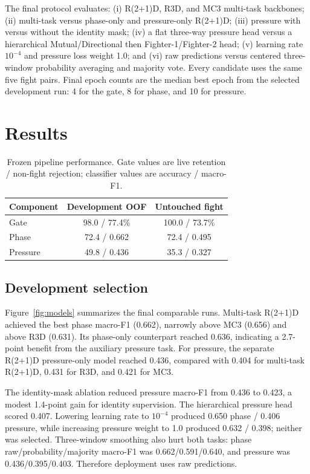 \documentclass[10pt,twocolumn]{article}
\newcommand{\macroF}{macro-F1}
\newcommand{\Rtwo}{R(2+1)D}
\begin{document}
The final protocol evaluates: (i) \Rtwo, R3D, and MC3 multi-task backbones; (ii) multi-task versus phase-only and pressure-only \Rtwo; (iii) pressure with versus without the identity mask; (iv) a flat three-way pressure head versus a hierarchical Mutual/Directional then Fighter-1/Fighter-2 head; (v) learning rate $10^{-4}$ and pressure loss weight 1.0; and (vi) raw predictions versus centered three-window probability averaging and majority vote. Every candidate uses the same five fight pairs. Final epoch counts are the median best epoch from the selected development run: 4 for the gate, 8 for phase, and 10 for pressure.

\section{Results}

\begin{table}[t]
\centering
\caption{Frozen pipeline performance. Gate values are live retention / non-fight rejection; classifier values are accuracy / \macroF{}.}
\label{tab:main}
\small
\begin{tabular}{lcc}
\toprule
Component & Development OOF & Untouched fight \\
\midrule
Gate & 98.0 / 77.4\% & 100.0 / 73.7\% \\
Phase & 72.4 / 0.662 & 72.4 / 0.495 \\
Pressure & 49.8 / 0.436 & 35.3 / 0.327 \\
\bottomrule
\end{tabular}
\end{table}

\subsection{Development selection}

Figure~\ref{fig:models} summarizes the final comparable runs. Multi-task \Rtwo{} achieved the best phase \macroF{} (0.662), narrowly above MC3 (0.656) and above R3D (0.631). Its phase-only counterpart reached 0.636, indicating a 2.7-point benefit from the auxiliary pressure task. For pressure, the separate \Rtwo{} pressure-only model reached 0.436, compared with 0.404 for multi-task \Rtwo, 0.431 for R3D, and 0.421 for MC3.

The identity-mask ablation reduced pressure \macroF{} from 0.436 to 0.423, a modest 1.4-point gain for identity supervision. The hierarchical pressure head scored 0.407. Lowering learning rate to $10^{-4}$ produced 0.650 phase / 0.406 pressure, while increasing pressure weight to 1.0 produced 0.632 / 0.398; neither was selected. Three-window smoothing also hurt both tasks: phase raw/probability/majority \macroF{} was 0.662/0.591/0.640, and pressure was 0.436/0.395/0.403. Therefore deployment uses raw predictions.
\end{document}
